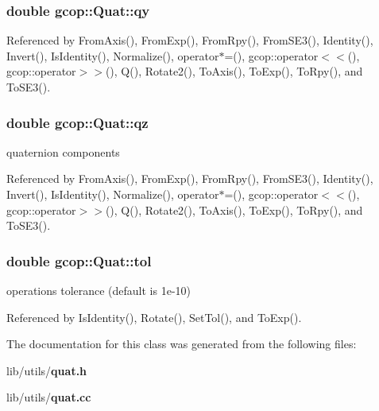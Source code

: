\subsubsection[{qy}]{\setlength{\rightskip}{0pt plus 5cm}double {\bf gcop\-::\-Quat\-::qy}}\label{classgcop_1_1Quat_a2fa854ee54fa7f7fb1e6dcf21326e428}


\-Referenced by \-From\-Axis(), \-From\-Exp(), \-From\-Rpy(), \-From\-S\-E3(), \-Identity(), \-Invert(), \-Is\-Identity(), \-Normalize(), operator$\ast$=(), gcop\-::operator$<$$<$(), gcop\-::operator$>$$>$(), \-Q(), \-Rotate2(), \-To\-Axis(), \-To\-Exp(), \-To\-Rpy(), and \-To\-S\-E3().

\subsubsection[{qz}]{\setlength{\rightskip}{0pt plus 5cm}double {\bf gcop\-::\-Quat\-::qz}}\label{classgcop_1_1Quat_a2231737de2e049ecf9d22b442e00629b}


quaternion components 



\-Referenced by \-From\-Axis(), \-From\-Exp(), \-From\-Rpy(), \-From\-S\-E3(), \-Identity(), \-Invert(), \-Is\-Identity(), \-Normalize(), operator$\ast$=(), gcop\-::operator$<$$<$(), gcop\-::operator$>$$>$(), \-Q(), \-Rotate2(), \-To\-Axis(), \-To\-Exp(), \-To\-Rpy(), and \-To\-S\-E3().

\subsubsection[{tol}]{\setlength{\rightskip}{0pt plus 5cm}double {\bf gcop\-::\-Quat\-::tol}\hspace{0.3cm}{\ttfamily  [protected]}}\label{classgcop_1_1Quat_afb65f904ad3238a34fddda59d706a571}


operations tolerance (default is 1e-\/10) 



\-Referenced by \-Is\-Identity(), \-Rotate(), \-Set\-Tol(), and \-To\-Exp().



\-The documentation for this class was generated from the following files\-:\begin{DoxyCompactItemize}
\item 
lib/utils/{\bf quat.\-h}\item 
lib/utils/{\bf quat.\-cc}\end{DoxyCompactItemize}
